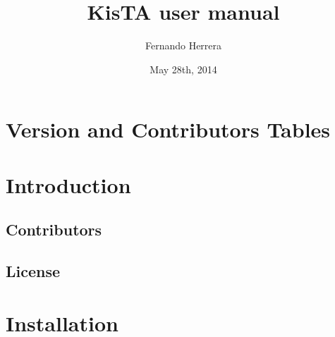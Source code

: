 \documentclass{article}
\title{KisTA user manual}
\author{Fernando Herrera}
\date{May 28th, 2014}
\newif\ifpdf
\begin{document}
\ifpdf



\pagebreak

\fi

\section{Version and Contributors Tables}



\ifpdf
\pagebreak
\fi





\tableofcontents

\newpage



\section{Introduction}
\label{sec:introduction}



\subsection{Contributors}
\label{sec:contributors}




\subsection{License}
\label{sec:license}



\section{Installation}
\label{sec:installation}
\end{document}
